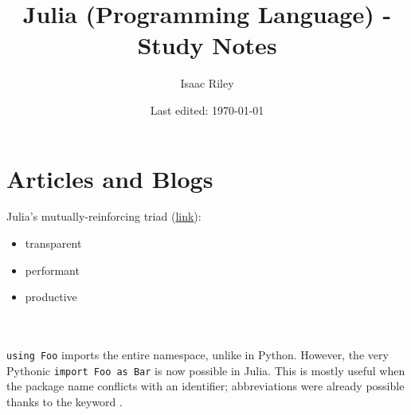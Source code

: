 \documentclass[a4paper]{article}
\title{Julia (Programming Language) - Study Notes}
\author{Isaac Riley}
\date{Last edited: \today}
\begin{document}
\maketitle
\tableofcontents
\newpage


\section{Articles and Blogs}
Julia's mutually-reinforcing triad (\href{https://redrapids.medium.com/why-is-julias-flux-catching-fire-for-ml-8763848df90c}{link}):
\begin{itemize}
    \item transparent
    \item performant
    \item productive
\end{itemize}
\\~\\
\noindent\texttt{using Foo} imports the entire namespace, unlike in Python. However, the very Pythonic \texttt{import Foo as Bar} is now possible in Julia. This is mostly useful when the package name conflicts with an identifier; abbreviations were already possible thanks to the keyword .
\end{document}
